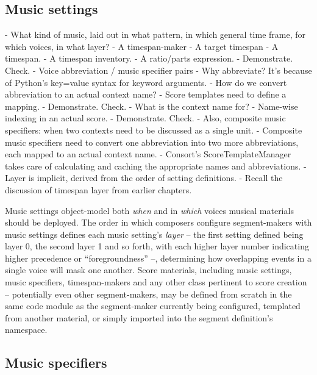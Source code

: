 \subsection{Music settings}
\label{ssec:music-settings}

\begin{markdown}
-   What kind of music, laid out in what pattern, in which general
    time frame, for which voices, in what layer?
-   A timespan-maker
-   A target timespan
    -   A timespan.
    -   A timespan inventory.
    -   A ratio/parts expression.
        -   Demonstrate. Check.
-   Voice abbreviation / music specifier pairs
    -   Why abbreviate? It's because of Python's key=value syntax for
        keyword arguments.
    -   How do we convert abbreviation to an actual context name?
        -   Score templates need to define a mapping.
        -   Demonstrate. Check.
    -   What is the context name for?
        -   Name-wise indexing in an actual score.
        -   Demonstrate. Check.
    -   Also, composite music specifiers: when two contexts need to be
        discussed as a single unit.
        -   Composite music specifiers need to convert one abbreviation into
            two more abbreviations, each mapped to an actual context name.
        -   Consort's ScoreTemplateManager takes care of calculating and
            caching the appropriate names and abbreviations.
-   Layer is implicit, derived from the order of setting definitions.
    -   Recall the discussion of timespan layer from earlier chapters.
\end{markdown}

Music settings object-model both \emph{when} and in
\emph{which} voices musical materials should be deployed. The order in which
composers configure segment-makers with music settings defines each music
setting's \emph{layer} -- the first setting defined being layer 0, the second
layer 1 and so forth, with each higher layer number indicating higher
precedence or \enquote{foregroundness} --, determining how overlapping events
in a single voice will mask one another. Score materials, including music
settings, music specifiers, timespan-makers and any other class pertinent to
score creation -- potentially even other segment-makers, may be defined from
scratch in the same code module as the segment-maker currently being
configured, templated from another material, or simply imported into the
segment definition's namespace.

\subsection{Music specifiers}
\label{ssec:music-specifiers}


